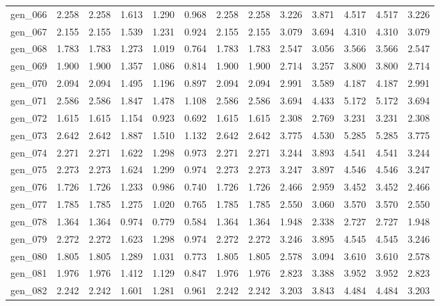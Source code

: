 \begin{tabular}{lrrrrrrrrrrrr}
gen\_066 &  2.258 &  2.258 &  1.613 &  1.290 &  0.968 &  2.258 &  2.258 &  3.226 &  3.871 &  4.517 &  4.517 &  3.226 \\
gen\_067 &  2.155 &  2.155 &  1.539 &  1.231 &  0.924 &  2.155 &  2.155 &  3.079 &  3.694 &  4.310 &  4.310 &  3.079 \\
gen\_068 &  1.783 &  1.783 &  1.273 &  1.019 &  0.764 &  1.783 &  1.783 &  2.547 &  3.056 &  3.566 &  3.566 &  2.547 \\
gen\_069 &  1.900 &  1.900 &  1.357 &  1.086 &  0.814 &  1.900 &  1.900 &  2.714 &  3.257 &  3.800 &  3.800 &  2.714 \\
gen\_070 &  2.094 &  2.094 &  1.495 &  1.196 &  0.897 &  2.094 &  2.094 &  2.991 &  3.589 &  4.187 &  4.187 &  2.991 \\
gen\_071 &  2.586 &  2.586 &  1.847 &  1.478 &  1.108 &  2.586 &  2.586 &  3.694 &  4.433 &  5.172 &  5.172 &  3.694 \\
gen\_072 &  1.615 &  1.615 &  1.154 &  0.923 &  0.692 &  1.615 &  1.615 &  2.308 &  2.769 &  3.231 &  3.231 &  2.308 \\
gen\_073 &  2.642 &  2.642 &  1.887 &  1.510 &  1.132 &  2.642 &  2.642 &  3.775 &  4.530 &  5.285 &  5.285 &  3.775 \\
gen\_074 &  2.271 &  2.271 &  1.622 &  1.298 &  0.973 &  2.271 &  2.271 &  3.244 &  3.893 &  4.541 &  4.541 &  3.244 \\
gen\_075 &  2.273 &  2.273 &  1.624 &  1.299 &  0.974 &  2.273 &  2.273 &  3.247 &  3.897 &  4.546 &  4.546 &  3.247 \\
gen\_076 &  1.726 &  1.726 &  1.233 &  0.986 &  0.740 &  1.726 &  1.726 &  2.466 &  2.959 &  3.452 &  3.452 &  2.466 \\
gen\_077 &  1.785 &  1.785 &  1.275 &  1.020 &  0.765 &  1.785 &  1.785 &  2.550 &  3.060 &  3.570 &  3.570 &  2.550 \\
gen\_078 &  1.364 &  1.364 &  0.974 &  0.779 &  0.584 &  1.364 &  1.364 &  1.948 &  2.338 &  2.727 &  2.727 &  1.948 \\
gen\_079 &  2.272 &  2.272 &  1.623 &  1.298 &  0.974 &  2.272 &  2.272 &  3.246 &  3.895 &  4.545 &  4.545 &  3.246 \\
gen\_080 &  1.805 &  1.805 &  1.289 &  1.031 &  0.773 &  1.805 &  1.805 &  2.578 &  3.094 &  3.610 &  3.610 &  2.578 \\
gen\_081 &  1.976 &  1.976 &  1.412 &  1.129 &  0.847 &  1.976 &  1.976 &  2.823 &  3.388 &  3.952 &  3.952 &  2.823 \\
gen\_082 &  2.242 &  2.242 &  1.601 &  1.281 &  0.961 &  2.242 &  2.242 &  3.203 &  3.843 &  4.484 &  4.484 &  3.203 \\

\end{tabular}
